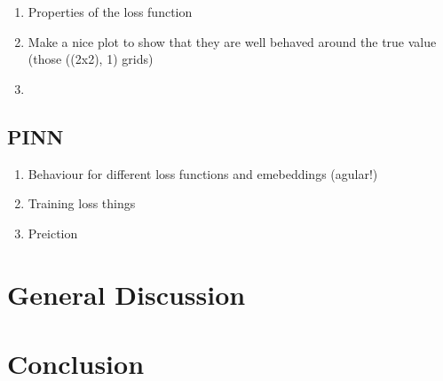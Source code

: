 \begin{enumerate}
	\item Properties of the loss function
	\item Make a nice plot to show that they are well behaved around the true value (those ((2x2), 1) grids)
	\item 
\end{enumerate}

\subsection{PINN}

\begin{enumerate}
	\item Behaviour for different loss functions and emebeddings (agular!)
	\item Training loss things
	\item Preiction
\end{enumerate}



\section{General Discussion}



\section{Conclusion}
